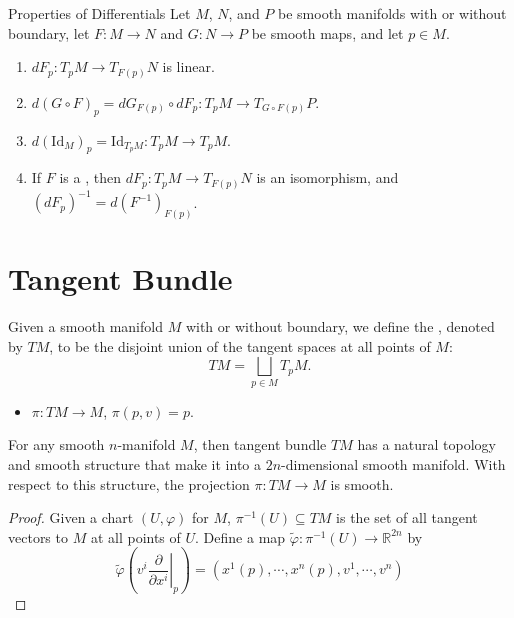 \documentclass[../main.tex]{subfiles}
\begin{document}
\begin{proposition}{Properties of Differentials}{}
Let $M$, $N$, and $P$ be smooth manifolds with or without boundary, let $F: M \to N$ and $G: N \to P$ be smooth maps, and let $p \in M$.
\begin{enumerate}
\item[(a)] $dF_p: T_p M \to T_{F(p)}N$ is linear.
\item[(b)] $d(G \circ F)_p = dG_{F(p)} \circ dF_p: T_p M \to T_{G \circ F(p)}P$.
\item[(c)] $d(\mathrm{Id}_M)_p = \mathrm{Id}_{T_p M}: T_p M \to T_p M$.
\item[(d)] If $F$ is a , then $dF_p: T_p M \to T_{F(p)}N$ is an isomorphism, and $(dF_p)^{-1} = d(F^{-1})_{F(p)}$.
\end{enumerate}
\end{proposition}
\section{Tangent Bundle}
\begin{definition}{}{}
    Given a smooth manifold $M$ with or without boundary, we define the , denoted by $TM$, to be the disjoint union of the tangent spaces at all points of $M$:
$$TM = \bigsqcup_{p \in M} T_p M.$$
\end{definition}
\begin{remark}
\begin{itemize}
    \item {} $\pi : TM \to M$, $\pi(p, v) = p$. 
\end{itemize}

\end{remark}

\begin{proposition}{}{}
    For any smooth \(  n  \)-manifold \(  M  \), then tangent bundle \(  TM  \) has a natural topology and smooth structure that make it into a \(  2n  \)-dimensional smooth manifold. With respect to this structure, the    projection \(   \pi: TM\to M  \) is smooth. 
\end{proposition}
\begin{proof}
    Given a chart \(  \left( U, \varphi  \right)   \) for \(  M  \), \(   \pi ^{-1} \left( U \right)\subseteq TM   \) is the set of all tangent vectors to \(  M  \) at all points of \(  U  \). Define a map \(   \tilde{\varphi} :  \pi ^{-1} \left( U \right)\to \mathbb{R} ^{2n}   \) by \[
     \tilde{\varphi} \left( v^{i}\left. \frac{\partial }{\partial x^{i}} \right|_{p} \right)= \left( x^{1}\left( p \right),\cdots ,x^{n}\left( p \right),v^{1},\cdots ,v^{n}   \right)  
    \]      
\end{proof}
\end{document}
